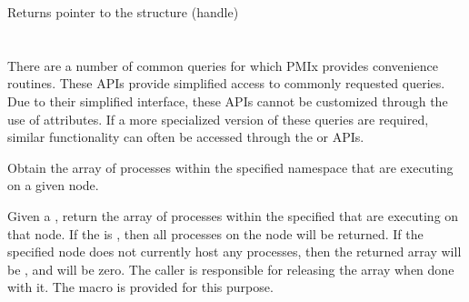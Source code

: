Returns pointer to the  structure (handle)

\section{}

There are a number of common queries for which \ac{PMIx} provides convenience routines.
These \acp{API} provide simplified access to commonly requested queries.  Due to their simplified interface, these \acp{API} cannot be customized through the use of attributes.
If a more specialized version of these queries are required, similar functionality can
often be accessed through the  or  \acp{API}.


\summary

Obtain the array of processes within the specified namespace that are executing on a given node.

\format


\begin{arglist}
\end{arglist}

\returnsimple

\descr

Given a , return the array of processes within the specified 
that are executing on that node.
If the  is , then all processes on the node will be returned.
If the specified node does not currently host any processes, then the returned array will be , and  will be zero.
The caller is responsible for releasing the  array when done with it.
The  macro is provided for this purpose.


